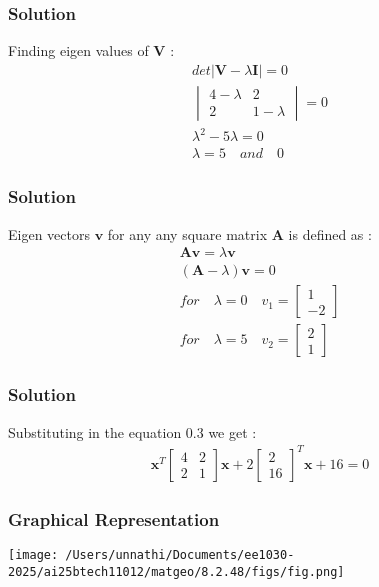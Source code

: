 \documentclass{beamer}
\begin{document}
\begin{frame}
\frametitle{Solution}
Finding eigen values of $\textbf{V}$ :
\begin{align}
    det\lvert \textbf{V} - \lambda\textbf{I} \rvert = 0\\
    \begin{vmatrix} 4 - \lambda & 2 \\ 2 & 1 - \lambda \end{vmatrix} = 0\\
    \lambda^2 - 5\lambda = 0\\
    \lambda = 5 \quad and \quad 0 
\end{align}


\end{frame}

\begin{frame}
\frametitle{Solution}
Eigen vectors $\textbf{v}$ for any any square matrix $\textbf{A}$ is defined as :
\begin{align}
    \textbf{A}\textbf{v} = \lambda\textbf{v}\\
    (\textbf{A} - \lambda)\textbf{v} = 0 \\
    for \quad \lambda = 0 \quad v_1 = \begin{bmatrix}1\\-2\end{bmatrix}\\
        for \quad \lambda = 5 \quad v_2 = \begin{bmatrix}2\\1\end{bmatrix}
\end{align}

\end{frame}

\begin{frame}
\frametitle{Solution}
Substituting in the equation 0.3 we get :
\begin{align}
  \textbf{x}^{T}\begin{bmatrix}4 & 2\\2 & 1\end{bmatrix}\textbf{x} + 2\begin{bmatrix}2 \\ 16\end{bmatrix}^{T}\textbf{x} +16 =0
\end{align}
\end{frame}



\begin{frame}
\frametitle{Graphical Representation}
\begin{center}
\texttt{[image: /Users/unnathi/Documents/ee1030-2025/ai25btech11012/matgeo/8.2.48/figs/fig.png]}
\end{center}
\end{frame}
\end{document}
